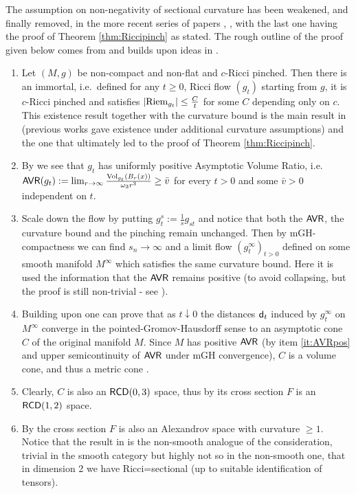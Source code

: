 \documentclass[11pt]{article}
\numberwithin{equation}{section}
\newcommand{\sfd}{{\sf d}}
\newcommand{\RCD}{{\sf RCD}}
\newcommand{\AVR}{{\sf AVR}}
\begin{document}
The assumption on non-negativity of sectional curvature has been weakened, and finally removed, in the more recent series of papers \cite{Lott19}, \cite{DSS22}, \cite{LT22}  with the last one having  the proof of  Theorem \ref{thm:Riccipinch} as stated. The rough outline of the proof given below comes from \cite{DSS22} and builds upon ideas in \cite{Lott19}.
\begin{enumerate}[label=(\roman*)]
\item Let $(M,g)$ be non-compact and non-flat and $c$-Ricci pinched. Then there is an immortal, i.e.\ defined for any $t\geq0$, Ricci flow $(g_t)$ starting from $g$, it is $c$-Ricci pinched and satisfies $|{\rm Riem}_{g_t}|\leq\frac Ct$ for some $C$ depending only on $c$. This existence result together with the curvature bound is the main result in \cite{LT22} (previous works gave existence under additional curvature assumptions) and the one that ultimately led to the proof of Theorem \ref{thm:Riccipinch}.
\item\label{it:AVRpos} By \cite[Propositions 1.5, 3.1 and 4.1]{Lott19}  we see that $g_t$ has  uniformly positive Asymptotic Volume Ratio, i.e.\ $\AVR(g_t):=\lim_{r\to\infty}\frac{{\rm Vol}_{g_t}(B_r(x))}{\omega_3r^3}\geq \bar v$ for every $t>0$ and some $\bar v>0$ independent on $t$. 
\item Scale down the flow by putting $g^s_t:=\tfrac1sg_{st}$ and notice that both the $\AVR$, the curvature bound and the pinching remain unchanged. Then by mGH-compactness we  can find $s_n\to\infty$ and a limit flow $(g^\infty_t)_{t>0}$ defined on some smooth manifold $M^\infty$ which satisfies the same curvature bound. Here it is used the information that the $\AVR$ remains positive (to avoid collapsing, but the  proof is still non-trivial  - see \cite[Propositions 1.6, Section 3]{Lott19}).
\item Building upon \cite{SimTop21} one can prove that as $t\downarrow0$ the distances $\sfd_t$ induced by $g^\infty_t$ on $M^\infty$ converge in the pointed-Gromov-Hausdorff sense to an asymptotic cone $C$ of the original manifold $M$.  Since $M$ has positive $\AVR$ (by item \ref{it:AVRpos} and upper semicontinuity of $\AVR$ under mGH convergence), $C$ is a volume cone, and thus a metric cone \cite{Cheeger-Colding96}.
\item Clearly, $C$ is also an $\RCD(0,3)$ space, thus by  \cite{Ketterer13} its cross section $F$ is an $\RCD(1,2)$ space.
\item By  \cite{LS18} the cross section $F$ is also an Alexandrov space with curvature $\geq 1$. Notice  that the result in \cite{LS18} is the non-smooth analogue of the consideration, trivial in the smooth category but highly not so in the non-smooth one, that in dimension 2 we have Ricci=sectional (up to suitable identification of tensors).

\end{enumerate}
\end{document}
